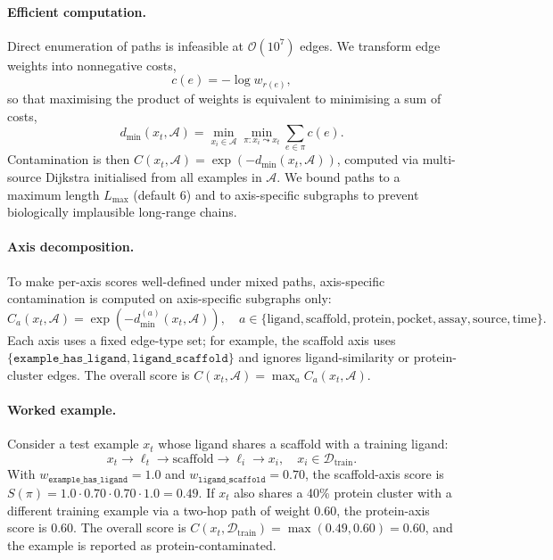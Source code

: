 \documentclass[11pt]{article}
\begin{document}
\paragraph{Efficient computation.}
Direct enumeration of paths is infeasible at \(\mathcal{O}(10^7)\) edges. We transform edge weights into nonnegative costs,
\[
c(e) = -\log w_{r(e)},
\]
so that maximising the product of weights is equivalent to minimising a sum of costs,
\[
d_{\min}(x_t, \mathcal{A})
=
\min_{x_i \in \mathcal{A}}
\min_{\pi: x_i \leadsto x_t}
\sum_{e\in\pi} c(e).
\]
Contamination is then \(C(x_t, \mathcal{A}) = \exp(-d_{\min}(x_t, \mathcal{A}))\), computed via multi-source Dijkstra initialised from all examples in \(\mathcal{A}\). We bound paths to a maximum length \(L_{\max}\) (default 6) and to axis-specific subgraphs to prevent biologically implausible long-range chains.

\paragraph{Axis decomposition.}
To make per-axis scores well-defined under mixed paths, axis-specific contamination is computed on axis-specific subgraphs only:
\[
C_a(x_t, \mathcal{A}) = \exp(-d^{(a)}_{\min}(x_t, \mathcal{A})),
\quad
a \in \{\text{ligand}, \text{scaffold}, \text{protein}, \text{pocket}, \text{assay}, \text{source}, \text{time}\}.
\]
Each axis uses a fixed edge-type set; for example, the scaffold axis uses \(\{\texttt{example\_has\_ligand}, \texttt{ligand\_scaffold}\}\) and ignores ligand-similarity or protein-cluster edges. The overall score is
\(
C(x_t, \mathcal{A}) = \max_a C_a(x_t, \mathcal{A}).
\)

\paragraph{Worked example.}
Consider a test example \(x_t\) whose ligand shares a scaffold with a training ligand:
\[
x_t \rightarrow \ell_t \rightarrow \text{scaffold} \rightarrow \ell_i \rightarrow x_i,
\quad x_i \in \mathcal{D}_{\mathrm{train}}.
\]
With \(w_{\texttt{example\_has\_ligand}} = 1.0\) and \(w_{\texttt{ligand\_scaffold}} = 0.70\), the scaffold-axis score is \(S(\pi) = 1.0 \cdot 0.70 \cdot 0.70 \cdot 1.0 = 0.49\). If \(x_t\) also shares a 40\% protein cluster with a different training example via a two-hop path of weight \(0.60\), the protein-axis score is \(0.60\). The overall score is \(C(x_t, \mathcal{D}_{\mathrm{train}}) = \max(0.49, 0.60) = 0.60\), and the example is reported as protein-contaminated.
\end{document}
